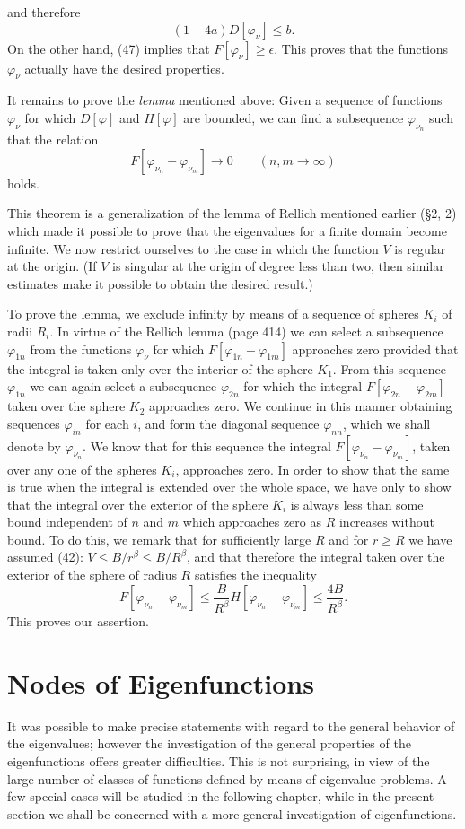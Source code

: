 and therefore
\[
(1-4a)D[\varphi_\nu]\le b.
\]
On the other hand, (47) implies that $F[\varphi_\nu]\ge\epsilon$. This proves that the functions $\varphi_\nu$ actually have the desired properties.

It remains to prove the \emph{lemma} mentioned above: Given a sequence of functions $\varphi_\nu$ for which $D[\varphi]$ and $H[\varphi]$ are bounded, we can find a subsequence $\varphi_{\nu_n}$ such that the relation
\[
F[\varphi_{\nu_n}-\varphi_{\nu_m}]\to0\qquad(n,m\to\infty)
\]
holds.

This theorem is a generalization of the lemma of Rellich mentioned earlier (\S2, 2) which made it possible to prove that the eigenvalues for a finite domain become infinite. We now restrict ourselves to the case in which the function $V$ is regular at the origin. (If $V$ is singular at the origin of degree less than two, then similar estimates make it possible to obtain the desired result.)

To prove the lemma, we exclude infinity by means of a sequence of spheres $K_i$ of radii $R_i$. In virtue of the Rellich lemma (page 414) we can select a subsequence $\varphi_{1n}$ from the functions $\varphi_\nu$ for which $F[\varphi_{1n}-\varphi_{1m}]$ approaches zero provided that the integral is taken only over the interior of the sphere $K_1$. From this sequence $\varphi_{1n}$ we can again select a subsequence $\varphi_{2n}$ for which the integral $F[\varphi_{2n}-\varphi_{2m}]$ taken over the sphere $K_2$ approaches zero. We continue in this manner obtaining sequences $\varphi_{in}$ for each $i$, and form the diagonal sequence $\varphi_{nn}$, which we shall denote by $\varphi_{\nu_n}$. We know that for this sequence the integral $F[\varphi_{\nu_n}-\varphi_{\nu_m}]$, taken over any one of the spheres $K_i$, approaches zero. In order to show that the same is true when the integral is extended over the whole space, we have only to show that the integral over the exterior of the sphere $K_i$ is always less than some bound independent of $n$ and $m$ which approaches zero as $R$ increases without bound. To do this, we remark that for sufficiently large $R$ and for $r\ge R$ we have assumed (42): $V\le B/r^\beta\le B/R^\beta$, and that therefore the integral taken over the exterior of the sphere of radius $R$ satisfies the inequality
\[
F[\varphi_{\nu_n}-\varphi_{\nu_m}]
\le \frac{B}{R^\beta}H[\varphi_{\nu_n}-\varphi_{\nu_m}]
\le \frac{4B}{R^\beta}.
\]
This proves our assertion.

\section{Nodes of Eigenfunctions}
It was possible to make precise statements with regard to the general behavior of the eigenvalues; however the investigation of the general properties of the eigenfunctions offers greater difficulties. This is not surprising, in view of the large number of classes of functions defined by means of eigenvalue problems. A few special cases will be studied in the following chapter, while in the present section we shall be concerned with a more general investigation of eigenfunctions.

